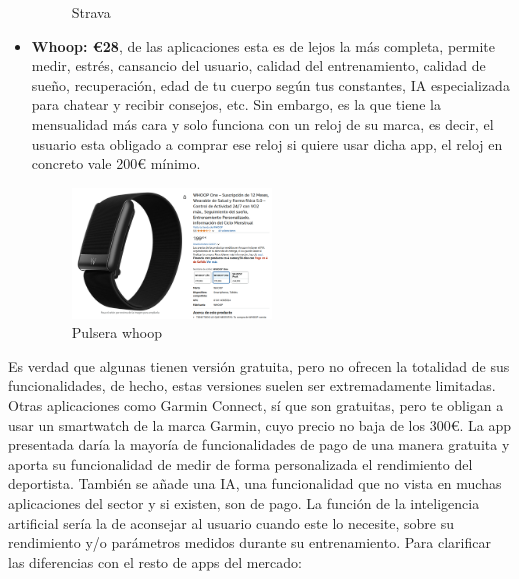\begin{itemize}
\begin{figure}[H]
    \caption{Strava}
    \label{fig:Strava}
\end{figure} 
	\item \textbf{Whoop: €28}, de las aplicaciones esta es de lejos la más completa, permite medir, estrés, cansancio del usuario, calidad del entrenamiento, calidad de sueño, recuperación, edad de tu cuerpo según tus constantes, IA especializada para chatear y recibir consejos, etc. Sin embargo, es la que tiene la mensualidad más cara y solo funciona con un reloj de su marca, es decir, el usuario esta obligado a comprar ese reloj si quiere usar dicha app, el reloj en concreto vale 200€ mínimo.
\begin{figure}[H]
   \centering
    \includegraphics[width=0.5\textwidth]{fotos/Pulsera whoop.png}
    \caption{Pulsera whoop}
    \label{fig:Pulsera whoop}
\end{figure} 
\end{itemize}

Es verdad que algunas tienen versión gratuita, pero no ofrecen la totalidad de sus funcionalidades, de hecho, estas versiones suelen ser extremadamente limitadas. Otras aplicaciones como Garmin Connect, sí que son gratuitas, pero te obligan a usar un smartwatch de la marca Garmin, cuyo precio no baja de los 300€. 
La app presentada daría la mayoría de funcionalidades de pago de una manera gratuita y aporta su funcionalidad de medir de forma personalizada el rendimiento del deportista. También se añade una IA, una funcionalidad que no vista en muchas aplicaciones del sector y si existen, son de pago. La función de la inteligencia artificial sería la de aconsejar al usuario cuando este lo necesite, sobre su rendimiento y/o parámetros medidos durante su entrenamiento.
Para clarificar las diferencias con el resto de apps del mercado:

